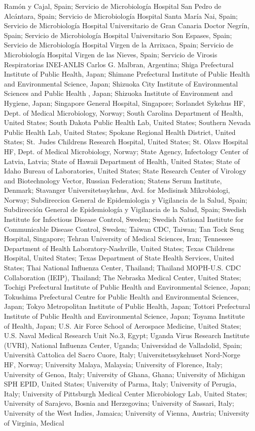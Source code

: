 Ramón y Cajal, Spain; Servicio de Microbiología Hospital San Pedro de Alcántara, Spain; Servicio de Microbiología Hospital Santa María Nai, Spain; Servicio de Microbiología Hospital Universitario de Gran Canaria Doctor Negrín, Spain; Servicio de Microbiología Hospital Universitario Son Espases, Spain; Servicio de Microbiología Hospital Virgen de la Arrixaca, Spain; Servicio de Microbiología Hospital Virgen de las Nieves, Spain; Servicio de Virosis Respiratorias INEI-ANLIS Carlos G. Malbran, Argentina; Shiga Prefectural Institute of Public Health, Japan; Shimane Prefectural Institute of Public Health and Environmental Science, Japan; Shizuoka City Institute of Environmental Sciences and Public Health , Japan; Shizuoka Institute of Environment and Hygiene, Japan; Singapore General Hospital, Singapore; Sorlandet Sykehus HF, Dept. of Medical Microbiology, Norway; South Carolina Department of Health, United States; South Dakota Public Health Lab, United States; Southern Nevada Public Health Lab, United States; Spokane Regional Health District, United States; St.\ Judes Childrens Research Hospital, United States; St. Olavs Hospital HF, Dept. of Medical Microbiology, Norway; State Agency, Infectology Center of Latvia, Latvia; State of Hawaii Department of Health, United States; State of Idaho Bureau of Laboratories, United States; State Research Center of Virology and Biotechnology Vector, Russian Federation; Statens Serum Institute, Denmark; Stavanger Universitetssykehus, Avd. for Medisinsk Mikrobiologi, Norway; Subdireccion General de Epidemiologia y Vigilancia de la Salud, Spain; Subdirección General de Epidemiología y Vigilancia de la Salud, Spain; Swedish Institute for Infectious Disease Control, Sweden; Swedish National Institute for Communicable Disease Control, Sweden; Taiwan CDC, Taiwan; Tan Tock Seng Hospital, Singapore; Tehran University of Medical Sciences, Iran; Tennessee Department of Health Laboratory-Nashville, United States; Texas Childrens Hospital, United States; Texas Department of State Health Services, United States; Thai National Influenza Center, Thailand; Thailand MOPH-U.S. CDC Collaboration (IEIP), Thailand; The Nebraska Medical Center, United States; Tochigi Prefectural Institute of Public Health and Environmental Science, Japan; Tokushima Prefectural Centre for Public Health and Environmental Sciences, Japan; Tokyo Metropolitan Institute of Public Health, Japan; Tottori Prefectural Institute of Public Health and Environmental Science, Japan; Toyama Institute of Health, Japan; U.S. Air Force School of Aerospace Medicine, United States; U.S. Naval Medical Research Unit No.3, Egypt; Uganda Virus Research Institute (UVRI), National Influenza Center, Uganda; Universidad de Valladolid, Spain; Università Cattolica del Sacro Cuore, Italy; Universitetssykehuset Nord-Norge HF, Norway; University Malaya, Malaysia; University of Florence, Italy; University of Genoa, Italy; University of Ghana, Ghana; University of Michigan SPH EPID, United States; University of Parma, Italy; University of Perugia, Italy; University of Pittsburgh Medical Center Microbiology Lab, United States; University of Sarajevo, Bosnia and Herzegovina; University of Sassari, Italy; University of the West Indies, Jamaica; University of Vienna, Austria; University of Virginia, Medical 